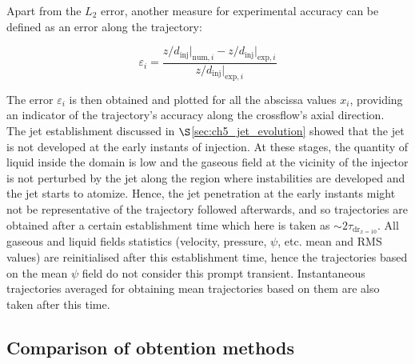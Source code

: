 Apart from the $L_2$ error, another measure for experimental accuracy can be defined as an error along the trajectory:



\begin{equation}
\label{eq:error_along_trajectory}
\varepsilon_i  =  \frac{ z/d_\mathrm{inj} \Bigr|_{\mathrm{num},i} - z/d_\mathrm{inj} \Bigr|_{\mathrm{exp},i} }{ z/d_\mathrm{inj} \Bigr|_{\mathrm{exp},i} }
\end{equation}

The error $\varepsilon_i$ is then obtained and plotted for all the abscissa values $x_i$, providing an indicator of the trajectory’s accuracy along the crossflow’s axial direction. \\


The jet establishment discussed in $\S$\ref{sec:ch5_jet_evolution} showed that the jet is not developed at the early instants of injection. At these stages, the quantity of liquid inside the domain is low and the gaseous field at the vicinity of the injector is not perturbed by the jet along the region where instabilities are developed and the jet starts to atomize. Hence, the jet penetration at the early instants might not be representative of the trajectory followed afterwards, and so trajectories are obtained after a certain establishment time which here is taken as $\sim 2 \tau_{\mathrm{dr}_{x=10}}$. All gaseous and liquid fields statistics (velocity, pressure, $\psi$, etc. mean and RMS values) are reinitialised after this establishment time, hence the trajectories based on the mean $\psi$ field do not consider this prompt transient. Instantaneous trajectories averaged for obtaining mean trajectories based on them are also taken after this time.


\subsection{Comparison of obtention methods}

